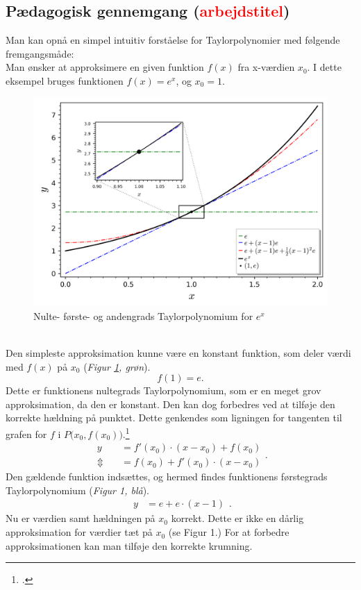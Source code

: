\documentclass[12pt, a4paper]{article}
\begin{document}
\begin{refsection}
\subsection{Pædagogisk gennemgang (\textcolor{red}{arbejdstitel})}
Man kan opnå en simpel intuitiv forståelse for Taylorpolynomier med følgende fremgangsmåde:\\
Man ønsker at approksimere en given funktion $f(x)$ fra x-værdien $x_0$. I dette eksempel bruges funktionen $f(x)=e^x$, og $x_0=1$.\\
\begin{figure}[h!]
     \includegraphics[width=\textwidth]{figures/ex-eksempel.png}
     \caption{Nulte- første- og andengrads Taylorpolynomium for $e^x$}
     \label{fig:ex-012tpol}
\end{figure}\\
Den simpleste approksimation kunne være en konstant funktion, som deler værdi med $f(x)$ på $x_0$ (\textit{Figur \ref{fig:ex-012tpol}, grøn}).
\[
f(1)=e
.\] 
Dette er funktionens nultegrads Taylorpolynomium, som er en meget grov approksimation, da den er konstant. Den kan dog forbedres ved at tilføje den korrekte hældning på punktet. Dette genkendes som ligningen for tangenten til grafen for $f$ i $P\big(x_0,f(x_0)\big)$.\footcite[s. 24, frml. 130]{formelsamling}
\[
\begin{aligned}
    y&=f'(x_0) \cdot (x-x_0)+f(x_0)\\
    \Updownarrow\quad &=f(x_0)+f'(x_0) \cdot (x-x_0)
\end{aligned}
.\] 
Den gældende funktion indsættes, og hermed findes funktionens førstegrads Taylorpolynomium  (\textit{Figur 1, blå}).\\
\[
\begin{aligned}
    y&=e+e\cdot (x-1)
\end{aligned}
.\] 
Nu er værdien samt hældningen på $x_0$ korrekt. Dette er ikke en dårlig approksimation for værdier tæt på $x_0$ (se Figur 1.) For at forbedre approksimationen kan man tilføje den korrekte krumning. 

\end{refsection}
\end{document}
